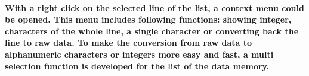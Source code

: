 \paragraph{With a right click on the selected line of the list, a context menu could be opened. This menu includes following functions: showing integer, characters of the whole line, a single character or converting back the line to raw data. To make the conversion from raw data to alphanumeric characters or integers more easy and fast, a multi selection function is developed for the list of the data memory.}